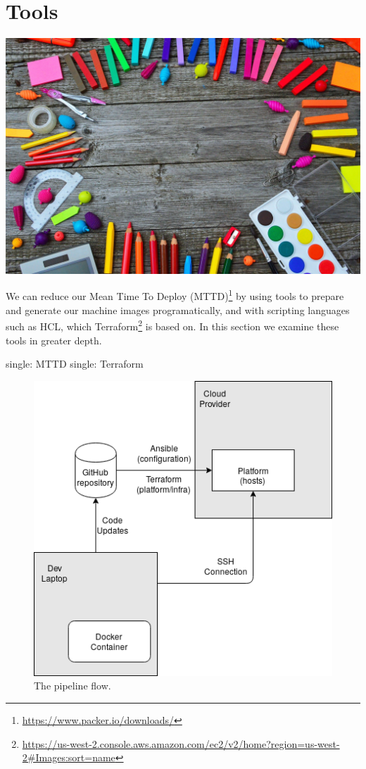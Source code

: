 \chapter{Tools}

\includegraphics{../images/school-tools-3596680_1920.jpg}

We can reduce our Mean Time To Deploy (MTTD)\footnote{\url{https://www.packer.io/downloads/}}
by using tools to prepare and generate our machine images
programatically, and with scripting languages such as HCL, which
Terraform\footnote{\url{https://us-west-2.console.aws.amazon.com/ec2/v2/home?region=us-west-2\#Images:sort=name}}
is based on. In this section we examine these tools in greater depth.

single: MTTD
single: Terraform

\begin{figure}
   \centering
   \includegraphics{../images/infra_flow.png}
   \caption{The pipeline flow.}
\end{figure}

